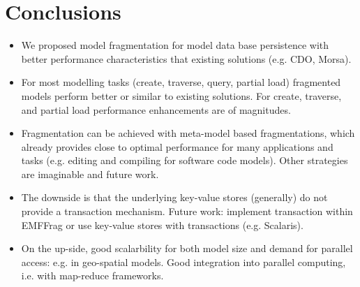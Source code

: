 \section{Conclusions}\label{sec:conclusions}

\begin{itemize}

\item We proposed model fragmentation for model data base persistence with better performance characteristics that existing solutions (e.g. CDO, Morsa).

\item For most modelling tasks (create, traverse, query, partial load) fragmented models perform better or similar to existing solutions. For create, traverse, and partial load performance enhancements are of magnitudes.

\item Fragmentation can be achieved with meta-model based fragmentations, which already provides close to optimal performance for many applications and tasks (e.g. editing and compiling for software code models). Other strategies are imaginable and future work.

\item The downside is that the underlying key-value stores (generally) do not provide a transaction mechanism. Future work: implement transaction within EMFFrag or use key-value stores with transactions (e.g. Scalaris).

\item On the up-side, good scalarbility for both model size and demand for parallel access: e.g. in geo-spatial models. Good integration into parallel computing, i.e. with map-reduce frameworks.

\end{itemize}